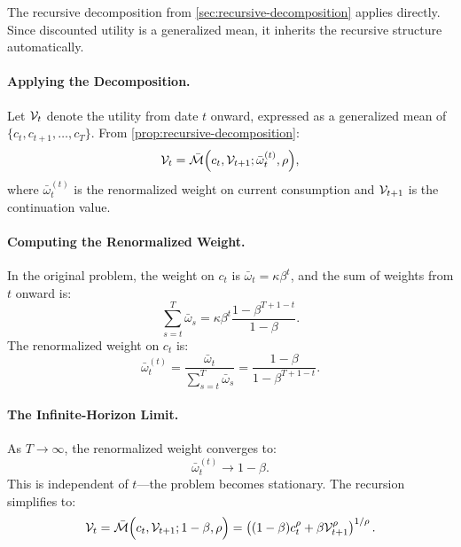 The recursive decomposition from \cref{sec:recursive-decomposition} applies directly. Since discounted utility is a generalized mean, it inherits the recursive structure automatically.

\paragraph{Applying the Decomposition.}
Let $\mathcal{V}_t$ denote the utility from date $t$ onward, expressed as a generalized mean of $\{c_t, c_{t+1}, \ldots, c_T\}$. From \cref{prop:recursive-decomposition}:
\begin{equation}
\mathcal{V}_t = \bar{\mathcal{M}}\Big( c_t, \mathcal{V}_{t+1}; \bar{\omega}_t^{(t)}, \rho \Big),
\label{eq:bellman-mean}
\end{equation}
where $\bar{\omega}_t^{(t)}$ is the renormalized weight on current consumption and $\mathcal{V}_{t+1}$ is the continuation value.

\paragraph{Computing the Renormalized Weight.}
In the original problem, the weight on $c_t$ is $\bar{\omega}_t = \kappa \beta^t$, and the sum of weights from $t$ onward is:
\begin{equation}
\sum_{s=t}^{T} \bar{\omega}_s = \kappa \beta^t \frac{1 - \beta^{T+1-t}}{1 - \beta}.
\label{eq:weight-sum-from-t}
\end{equation}
The renormalized weight on $c_t$ is:
\begin{equation}
\bar{\omega}_t^{(t)} = \frac{\bar{\omega}_t}{\sum_{s=t}^{T} \bar{\omega}_s} = \frac{1 - \beta}{1 - \beta^{T+1-t}}.
\label{eq:renormalized-current}
\end{equation}

\paragraph{The Infinite-Horizon Limit.}
As $T \to \infty$, the renormalized weight converges to:
\begin{equation}
\bar{\omega}_t^{(t)} \to 1 - \beta.
\label{eq:weight-infinite}
\end{equation}
This is independent of $t$---the problem becomes stationary. The recursion simplifies to:
\begin{equation}
\mathcal{V}_t = \bar{\mathcal{M}}\Big( c_t, \mathcal{V}_{t+1}; 1-\beta, \rho \Big) = \left( (1-\beta) c_t^\rho + \beta \mathcal{V}_{t+1}^\rho \right)^{1/\rho}.
\label{eq:bellman-infinite}
\end{equation}

